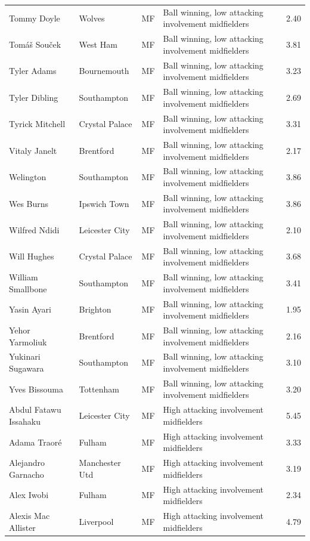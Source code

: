 \begin{longtable}{p{3.4cm}p{2.5cm}p{1.0cm}p{5.0cm}r}
Tommy Doyle & Wolves & MF & Ball winning, low attacking involvement midfielders & 2.40 \\
Tomáš Souček & West Ham & MF & Ball winning, low attacking involvement midfielders & 3.81 \\
Tyler Adams & Bournemouth & MF & Ball winning, low attacking involvement midfielders & 3.23 \\
Tyler Dibling & Southampton & MF & Ball winning, low attacking involvement midfielders & 2.69 \\
Tyrick Mitchell & Crystal Palace & MF & Ball winning, low attacking involvement midfielders & 3.31 \\
Vitaly Janelt & Brentford & MF & Ball winning, low attacking involvement midfielders & 2.17 \\
Welington & Southampton & MF & Ball winning, low attacking involvement midfielders & 3.86 \\
Wes Burns & Ipswich Town & MF & Ball winning, low attacking involvement midfielders & 3.86 \\
Wilfred Ndidi & Leicester City & MF & Ball winning, low attacking involvement midfielders & 2.10 \\
Will Hughes & Crystal Palace & MF & Ball winning, low attacking involvement midfielders & 3.68 \\
William Smallbone & Southampton & MF & Ball winning, low attacking involvement midfielders & 3.41 \\
Yasin Ayari & Brighton & MF & Ball winning, low attacking involvement midfielders & 1.95 \\
Yehor Yarmoliuk & Brentford & MF & Ball winning, low attacking involvement midfielders & 2.16 \\
Yukinari Sugawara & Southampton & MF & Ball winning, low attacking involvement midfielders & 3.10 \\
Yves Bissouma & Tottenham & MF & Ball winning, low attacking involvement midfielders & 3.20 \\
Abdul Fatawu Issahaku & Leicester City & MF & High attacking involvement midfielders & 5.45 \\
Adama Traoré & Fulham & MF & High attacking involvement midfielders & 3.33 \\
Alejandro Garnacho & Manchester Utd & MF & High attacking involvement midfielders & 3.19 \\
Alex Iwobi & Fulham & MF & High attacking involvement midfielders & 2.34 \\
Alexis Mac Allister & Liverpool & MF & High attacking involvement midfielders & 4.79 \\

\end{longtable}
